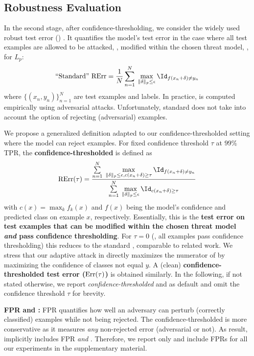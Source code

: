 \subsection{Robustness Evaluation}

In the second stage, after confidence-thresholding, we consider the widely used robust test error (\RTE) \cite{MadryICLR2018}. It quantifies the model's test error in the case where all test examples are allowed to be attacked, \ie, modified within the chosen threat model, \eg, for $L_p$:
\begin{align}
    \text{``Standard'' }\RTE = \frac{1}{N}\sum_{n = 1}^N \;\max\limits_{\|\delta\|_p\leq \epsilon} \Id_{f(x_n + \delta)\neq y_n}
\end{align}
where $\{(x_n,y_n)\}_{n = 1}^N$ are test examples and labels. In practice, \RTE is computed empirically using adversarial attacks. Unfortunately, standard \RTE does not take into account the option of rejecting (adversarial) examples.

We propose a generalized definition adapted to our confidence-thresholded setting where the model can reject examples. For fixed confidence threshold $\tau$ at $99\%$TPR, the \textbf{confidence-thresholded \RTE} is defined as
\begin{align}
    \RTE(\tau) = \frac{
    	\sum\limits_{n=1}^N \;\max\limits_{\|\delta\|_p\leq \epsilon, c(x_n + \delta)\geq \tau} \Id_{f(x_n + \delta)\neq y_n}
    }
    {
    	\sum\limits_{n=1}^N \;\max\limits_{\|\delta\|_p\leq \epsilon} \Id_{c(x_n + \delta)\geq \tau}
    }\label{eq:conf-rte}
\end{align}
with $c(x) = \max_k f_k(x)$ and $f(x)$ being the model's confidence and predicted class on example $x$, respectively. Essentially, this is the \textbf{test error on test examples that can be modified within the chosen threat model \emph{and} pass confidence thresholding}. For $\tau=0$ (\ie, all examples pass confidence thresholding) this reduces to the standard \RTE, comparable to related work. We stress that our adaptive attack in  directly maximizes the numerator of  by maximizing the confidence of classes not equal $y$. A (clean) \textbf{confidence-thresholded test error ($\TE(\tau)$)} is obtained similarly. In the following, if not stated otherwise, we report \emph{confidence-thresholded} \RTE and \TE as default and omit the confidence threshold $\tau$ for brevity.

\textbf{FPR and \RTE:}
%
FPR quantifies how well an adversary can perturb (correctly classified) examples while not being rejected. The confidence-thresholded \RTE is more conservative as it measures \emph{any} non-rejected error (adversarial or not). As result, \RTE implicitly includes FPR \emph{and} \TE. Therefore, we report only \RTE and include FPRs for all our experiments in the supplementary material.

